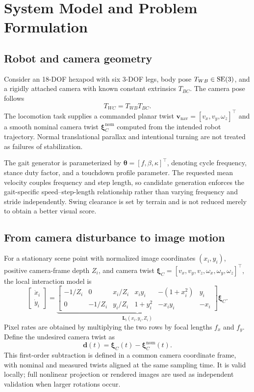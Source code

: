 \section{System Model and Problem Formulation}\label{sec:problem}
\subsection{Robot and camera geometry}
Consider an 18-DOF hexapod with six 3-DOF legs, body pose $T_{WB}\in\mathrm{SE}(3)$, and a rigidly attached camera with known constant extrinsics $T_{BC}$. The camera pose follows
\begin{equation}\label{eq:cam_pose}
T_{WC}=T_{WB}T_{BC}.
\end{equation}
The locomotion task supplies a commanded planar twist $\bm{v}_{\mathrm{nav}}=[v_x,v_y,\omega_z]^\top$ and a smooth nominal camera twist $\bm\xi_C^{\mathrm{nom}}$ computed from the intended robot trajectory. Normal translational parallax and intentional turning are not treated as failures of stabilization.

The gait generator is parameterized by $\bm\theta=[f,\beta,\kappa]^\top$, denoting cycle frequency, stance duty factor, and a touchdown profile parameter. The requested mean velocity couples frequency and step length, so candidate generation enforces the gait-specific speed--step-length relationship rather than varying frequency and stride independently. Swing clearance is set by terrain and is not reduced merely to obtain a better visual score.

\subsection{From camera disturbance to image motion}
For a stationary scene point with normalized image coordinates $(x_i,y_i)$, positive camera-frame depth $Z_i$, and camera twist $\bm\xi_C=[v_x,v_y,v_z,\omega_x,\omega_y,\omega_z]^\top$, the local interaction model is
\begin{equation}\label{eq:interaction}
\begin{bmatrix}\dot x_i\\\dot y_i\end{bmatrix}=
\underbrace{\begin{bmatrix}
-1/Z_i&0&x_i/Z_i&x_iy_i&-(1+x_i^2)&y_i\\
0&-1/Z_i&y_i/Z_i&1+y_i^2&-x_iy_i&-x_i
\end{bmatrix}}_{\bm L_i(x_i,y_i,Z_i)}\bm\xi_C.
\end{equation}
Pixel rates are obtained by multiplying the two rows by focal lengths $f_x$ and $f_y$. Define the undesired camera twist as
\begin{equation}\label{eq:disturbance}
\bm d(t)=\bm\xi_C(t)-\bm\xi_C^{\mathrm{nom}}(t).
\end{equation}
This first-order subtraction is defined in a common camera coordinate frame, with nominal and measured twists aligned at the same sampling time. It is valid locally; full nonlinear projection or rendered images are used as independent validation when larger rotations occur.

